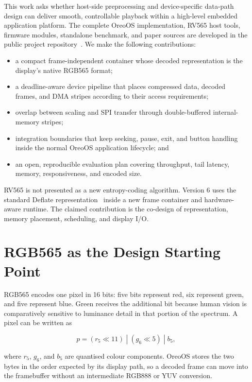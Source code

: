 \documentclass[11pt,twocolumn]{article}
\newcommand{\system}{RV565}
\begin{document}
This work asks whether host-side preprocessing and device-specific data-path
design can deliver smooth, controllable playback within a high-level embedded
application platform.  The complete OreoOS implementation, RV565 host tools,
firmware modules, standalone benchmark, and paper sources are developed in the
public project repository~\cite{bhattacharya2026oreo}.  We make the following
contributions:

\begin{itemize}
  \item a compact frame-independent container whose decoded representation is
        the display's native RGB565 format;
  \item a deadline-aware device pipeline that places compressed data, decoded
        frames, and DMA stripes according to their access requirements;
  \item overlap between scaling and SPI transfer through double-buffered
        internal-memory stripes;
  \item integration boundaries that keep seeking, pause, exit, and button
        handling inside the normal OreoOS application lifecycle; and
  \item an open, reproducible evaluation plan covering throughput, tail
        latency, memory, responsiveness, and encoded size.
\end{itemize}

\system{} is not presented as a new entropy-coding algorithm.  Version 6 uses
the standard Deflate representation~\cite{deutsch1996deflate} inside a new
frame container and hardware-aware runtime.  The claimed contribution is the
co-design of representation, memory placement, scheduling, and display I/O.

\section{RGB565 as the Design Starting Point}

RGB565 encodes one pixel in 16 bits: five bits represent red, six represent
green, and five represent blue.  Green receives the additional bit because
human vision is comparatively sensitive to luminance detail in that portion
of the spectrum.  A pixel can be written as

\begin{equation}
p=(r_5 \ll 11)\;|\;(g_6 \ll 5)\;|\;b_5,
\end{equation}

where $r_5$, $g_6$, and $b_5$ are quantised colour components.  OreoOS stores
the two bytes in the order expected by its display path, so a decoded frame can
move into the framebuffer without an intermediate RGB888 or YUV conversion.
\end{document}
